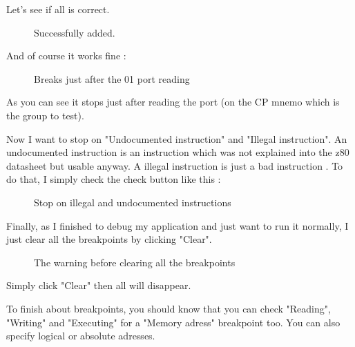 \documentclass[10pt]{report}
\begin{document}
Let's see if all is correct.\newline
\begin{figure}[H]
\centering
{}
\caption{Successfully added.}
\end{figure}

And of course it works fine :\newline
\begin{figure}[H]
\centering
{}
\caption{Breaks just after the 01 port reading}
\end{figure}

As you can see it stops just after reading the port (on the CP mnemo which is the group to test).\newline

Now I want to stop on "Undocumented instruction" and "Illegal instruction".\newline
An undocumented instruction is an instruction which was not explained into the z80 datasheet but usable anyway.\newline
A illegal instruction is just a bad instruction .\newline
To do that, I simply check the check button like this :\newline
\begin{figure}[H]
\centering
{}
\caption{Stop on illegal and undocumented instructions}
\end{figure}

Finally, as I finished to debug my application and just want to run it normally, I just clear all the breakpoints by clicking "Clear".\newline
\begin{figure}[H]
\centering
{}
\caption{The warning before clearing all the breakpoints}
\end{figure}
Simply click "Clear" then all will disappear.\newline\newline

To finish about breakpoints, you should know that you can check "Reading", "Writing" and "Executing" for a "Memory adress" breakpoint too.\newline
You can also specify logical or absolute adresses.\newline\newline
\end{document}
